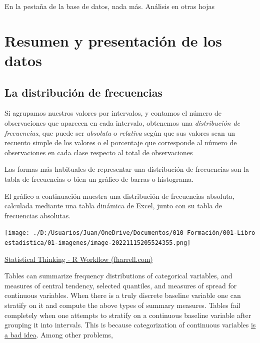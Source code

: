 \documentclass[
  letterpaper,
]{scrbook}
\begin{document}
En la pestaña de la base de datos, nada más. Análisis en otras hojas


\hypertarget{resumen-y-presentaciuxf3n-de-los-datos}{%
\chapter{Resumen y presentación de los
datos}\label{resumen-y-presentaciuxf3n-de-los-datos}}

\hypertarget{la-distribuciuxf3n-de-frecuencias}{%
\section{La distribución de
frecuencias}\label{la-distribuciuxf3n-de-frecuencias}}

Si agrupamos nuestros valores por intervalos, y contamos el número de
observaciones que aparecen en cada intervalo, obtenemos una
\emph{distribución de frecuencias}, que puede ser \emph{absoluta} o
\emph{relativa} según que sus valores sean un recuento simple de los
valores o el porcentaje que corresponde al número de observaciones en
cada clase respecto al total de observaciones

Las formas más habituales de representar una distribución de frecuencias
son la tabla de frecuencias o bien un gráfico de barras o histograma.

El gráfico a continuación muestra una distribución de frecuencias
absoluta, calculada mediante una tabla dinámica de Excel, junto con su
tabla de frecuencias absolutas.

\texttt{[image: ./D:/Usuarios/Juan/OneDrive/Documentos/010 Formación/001-Libro estadistica/01-imagenes/image-20221115205524355.png]}

\href{https://www.fharrell.com/post/rflow/\#descriptive-statistics}{Statistical
Thinking - R Workflow (fharrell.com)}

Tables can summarize frequency distributions of categorical variables,
and measures of central tendency, selected quantiles, and measures of
spread for continuous variables. When there is a truly discrete baseline
variable one can stratify on it and compute the above types of summary
measures. Tables fail completely when one attempts to stratify on a
continuous baseline variable after grouping it into intervals. This is
because categorization of continuous variables
\href{https://discourse.datamethods.org/t/categorizing-continuous-variables}{is
a bad idea}. Among other problems,
\end{document}
